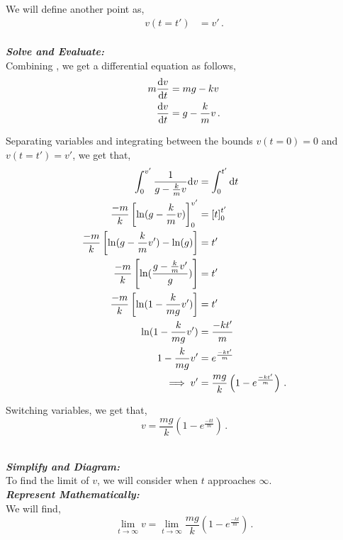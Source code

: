 \begin{subquestions}
\begin{subsubquestions}
We will define another point as,
\begin{align}
	v(t=t') & = v' \,.
\end{align}\\



\textbf{\textit{Solve and Evaluate:}} \\ 
Combining , we get a differential equation as follows,
\begin{align}
	m\frac{\mathrm{d}v}{\mathrm{d}t} & = mg - kv \nonumber \\
	\frac{\mathrm{d}v}{\mathrm{d}t} & = g -\frac{k}{m}v \,.
\end{align}

Separating variables and integrating between the bounds $v(t=0)=0$ and $v(t=t')=v'$, we get that,
\begin{align}
	\int_{0}^{v'}\frac{1}{g-\frac{k}{m}v} \mathrm{d} v & = \int_{0}^{t'} \mathrm{d} t \nonumber \\
	\frac{-m}{k}\left[\ln(g-\frac{k}{m}v)\right]_{0}^{v'} & = \left[t\right]_0^{t'} \nonumber \\
	\frac{-m}{k}\left[\ln(g-\frac{k}{m}v')-\ln(g)\right] & = t' \nonumber \\
	\frac{-m}{k}\left[\ln(\frac{g-\frac{k}{m}v'}{g})\right] & = t' \nonumber \\
	\frac{-m}{k}\left[\ln(1-\frac{k}{mg}v')\right] & = t' \nonumber \\
	\ln(1-\frac{k}{mg}v') & = \frac{-kt'}{m} \nonumber \\
	1-\frac{k}{mg}v' & = e^{\frac{-kt'}{m}} \nonumber \\
	\implies v' & = \frac{mg}{k}\left(1-e^{\frac{-kt'}{m}}\right) \,.
\end{align}

Switching variables, we get that, 
\begin{equation}
	v = \frac{mg}{k}\left(1-e^{\frac{-kt}{m}}\right) \,.
\end{equation}\\


\subsubquestion

\textbf{\textit{Simplify and Diagram:}} \\ 
To find the limit of $v$, we will consider when $t$ approaches $\infty$.\\




\textbf{\textit{Represent Mathematically:}} \\ 
We will find,
\begin{equation}
	\lim_{t\rightarrow \infty} v = \lim_{t\rightarrow \infty}      \frac{mg}{k}\left(1-e^{\frac{-kt}{m}}\right) \label{2005:q5:TLim} \,.
\end{equation}\\





\end{subsubquestions}
\end{subquestions}

